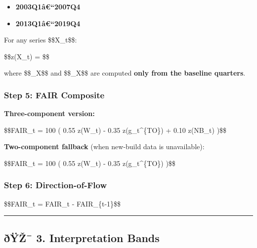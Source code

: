 \begin{itemize}
\tightlist
\item
  \textbf{2003Q1â€``2007Q4}
\item
  \textbf{2013Q1â€``2019Q4}
\end{itemize}

For any series \$\$X\_t\$\$:

\$\$z(X\_t) = \$\$

where \$\$\mu\_X\$\$ and \$\$\sigma\_X\$\$ are computed \textbf{only
from the baseline quarters}.

\subsubsection{Step 5: FAIR Composite}\label{step-5-fair-composite}

\textbf{Three-component version:}

\$\$FAIR\_t = 100 \cdot \Big( 0.55 \cdot z(W\_t) - 0.35
\cdot z(g\_t\^{}\{TO\}) + 0.10 \cdot z(\Delta NB\_t) \Big)\$\$

\textbf{Two-component fallback} (when new-build data is unavailable):

\$\$FAIR\_t = 100 \cdot \Big( 0.55 \cdot z(W\_t) - 0.35
\cdot z(g\_t\^{}\{TO\}) \Big)\$\$

\subsubsection{Step 6:
Direction-of-Flow}\label{step-6-direction-of-flow}

\$\$\Delta FAIR\_t = FAIR\_t - FAIR\_\{t-1\}\$\$

\begin{center}\rule{0.5\linewidth}{0.5pt}\end{center}

\subsection{ðŸŽ¯ 3. Interpretation
Bands}\label{uxf0uxffux17e-3.-interpretation-bands}

